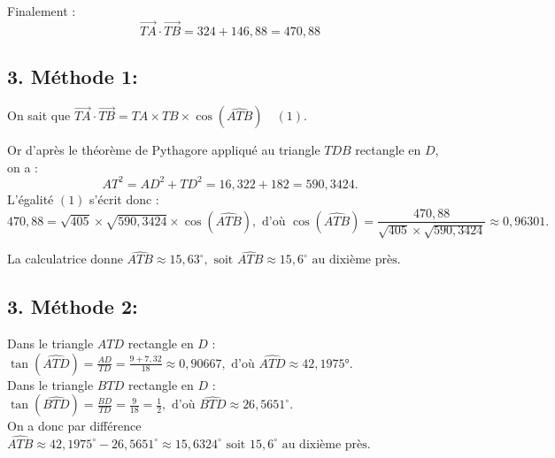 \documentclass[10pt]{article}
\begin{document}
	Finalement :
	\[
	\overrightarrow{TA} \cdot \overrightarrow{TB} = 324 + 146,88 = 470,88
	\]
	
	\subsection*{3. Méthode 1:}
	On sait que $\overrightarrow{TA} \cdot \overrightarrow{TB} = TA \times TB \times \cos (\widehat{ATB}) \quad(1)$.
	
	Or d’après le théorème de Pythagore appliqué au triangle $TDB$ rectangle en $D$, on a :
	\[
	AT^2 = AD^2 + TD^2 = 16,322 + 182 = 590,3424.
	\]
	L’égalité $(1)$ s’écrit donc :
	\[
	470,88 = \sqrt{405} \times \sqrt{590,3424} \times \cos (\widehat{ATB}), \text{ d’où }
	\cos (\widehat{ATB}) = \frac{470,88}{\sqrt{405} \times \sqrt{590,3424}} \approx 0,96301.
	\]
	
	La calculatrice donne $\widehat{ATB} \approx 15,63^{\circ}, \text{ soit } \widehat{ATB} \approx 15,6^{\circ} \text{ au dixième près.}$
	
	\subsection*{3. Méthode 2:}
	Dans le triangle $ATD$ rectangle en $D$ :\\
	$ \tan (\widehat{ATD}) = \frac{AD}{TD} = \frac{9+7,32}{18} \approx 0,90667, \text{ d’où } \widehat{ATD} \approx 42,1975°.$\\
	Dans le triangle $BTD$ rectangle en $D$ :\\
	$ \tan (\widehat{BTD}) = \frac{BD}{TD} = \frac{9}{18} = \frac{1}{2}, \text{ d’où } \widehat{BTD} \approx 26,5651^{\circ}.$\\
	On a donc par différence $\widehat{ATB} \approx 42,1975^{\circ} - 26,5651^{\circ} \approx 15,6324^{\circ} \text{ soit } 15,6^{\circ} \text{ au dixième près.}$
\end{document}
